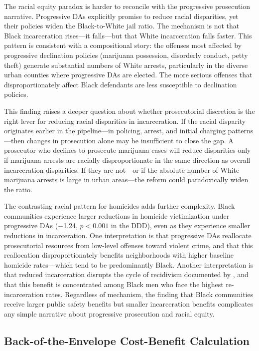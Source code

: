 \documentclass[12pt]{article}
\begin{document}
The racial equity paradox is harder to reconcile with the progressive prosecution narrative. Progressive DAs explicitly promise to reduce racial disparities, yet their policies widen the Black-to-White jail ratio. The mechanism is not that Black incarceration rises---it falls---but that White incarceration falls faster. This pattern is consistent with a compositional story: the offenses most affected by progressive declination policies (marijuana possession, disorderly conduct, petty theft) generate substantial numbers of White arrests, particularly in the diverse urban counties where progressive DAs are elected. The more serious offenses that disproportionately affect Black defendants are less susceptible to declination policies.

This finding raises a deeper question about whether prosecutorial discretion is the right lever for reducing racial disparities in incarceration. If the racial disparity originates earlier in the pipeline---in policing, arrest, and initial charging patterns---then changes in prosecution alone may be insufficient to close the gap. A prosecutor who declines to prosecute marijuana cases will reduce disparities only if marijuana arrests are racially disproportionate in the same direction as overall incarceration disparities. If they are not---or if the absolute number of White marijuana arrests is large in urban areas---the reform could paradoxically widen the ratio.

The contrasting racial pattern for homicides adds further complexity. Black communities experience larger reductions in homicide victimization under progressive DAs ($-$1.24, $p < 0.001$ in the DDD), even as they experience smaller reductions in incarceration. One interpretation is that progressive DAs reallocate prosecutorial resources from low-level offenses toward violent crime, and that this reallocation disproportionately benefits neighborhoods with higher baseline homicide rates---which tend to be predominantly Black. Another interpretation is that reduced incarceration disrupts the cycle of recidivism documented by \citet{harding2018imprisonment}, and that this benefit is concentrated among Black men who face the highest re-incarceration rates. Regardless of mechanism, the finding that Black communities receive larger public safety benefits but smaller incarceration benefits complicates any simple narrative about progressive prosecution and racial equity.

\subsection{Back-of-the-Envelope Cost-Benefit Calculation}
\end{document}
